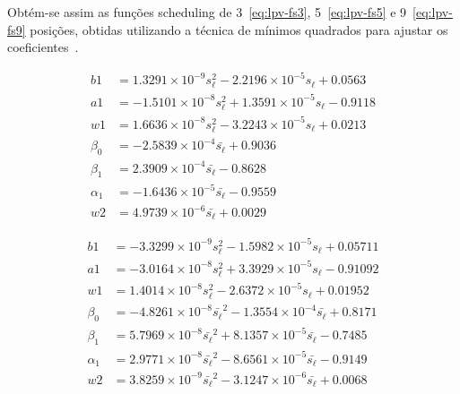 Obtém-se assim as funções scheduling de 3~\eqref{eq:lpv-fs3},
5~\eqref{eq:lpv-fs5} e 9~\eqref{eq:lpv-fs9} posições, obtidas utilizando a
técnica de mínimos quadrados para ajustar os
coeficientes~\cite{masterthesis:nelson,}.

\begin{equation}
	\label{eq:lpv-fs3}
	\begin{aligned}
		b1       & = 1.3291\times{}10^{-9} s_\ell^2 - 2.2196\times{}10^{-5} s_\ell + 0.0563  \\
		a1       & = -1.5101\times{}10^{-8} s_\ell^2 + 1.3591\times{}10^{-5} s_\ell - 0.9118 \\
		w1       & = 1.6636\times{}10^{-8} s_\ell^2 - 3.2243\times{}10^{-5} s_\ell + 0.0213  \\
		\beta_0  & = -2.5839\times{}10^{-4} \bar{s_\ell} + 0.9036                     \\
		\beta_1  & = 2.3909\times{}10^{-4} \bar{s_\ell} - 0.8628                      \\
		\alpha_1 & = -1.6436\times{}10^{-5} \bar{s_\ell} - 0.9559                     \\
		w2       & = 4.9739\times{}10^{-6} \bar{s_\ell} + 0.0029
	\end{aligned}
\end{equation}

\begin{equation}
	\label{eq:lpv-fs5}
	\begin{aligned}
		b1       & = -3.3299\times{}10^{-9} s_\ell^2 - 1.5982\times{}10^{-5} s_\ell + 0.05711                    \\
		a1       & = -3.0164\times{}10^{-8} s_\ell^2 + 3.3929\times{}10^{-5} s_\ell - 0.91092                    \\
		w1       & = 1.4014\times{}10^{-8} s_\ell^2 - 2.6372\times{}10^{-5} s_\ell + 0.01952                     \\
		\beta_0  & = -4.8261\times{}10^{-8} \bar{s_\ell}^2 - 1.3554\times{}10^{-4} \bar{s_\ell} + 0.8171 \\
		\beta_1  & = 5.7969\times{}10^{-8} \bar{s_\ell}^2 + 8.1357\times{}10^{-5} \bar{s_\ell} - 0.7485  \\
		\alpha_1 & = 2.9771\times{}10^{-8} \bar{s_\ell}^2 - 8.6561\times{}10^{-5} \bar{s_\ell} - 0.9149  \\
		w2       & = 3.8259\times{}10^{-9} \bar{s_\ell}^2 - 3.1247\times{}10^{-6} \bar{s_\ell} + 0.0068
	\end{aligned}
\end{equation}

